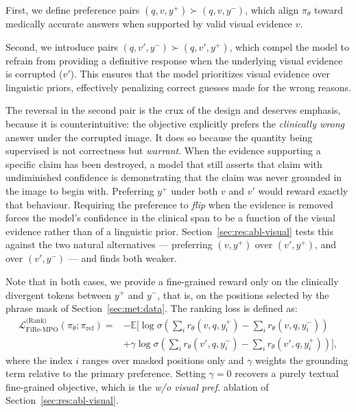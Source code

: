 First, we define preference pairs $(q, v, y^+) \succ (q, v, y^-)$, which align $\pi_\theta$ toward medically accurate answers when supported by valid visual evidence $v$.

Second, we introduce pairs $(q, v', y^-) \succ (q, v', y^+)$, which compel the model to refrain from providing a definitive response when the underlying visual evidence is corrupted ($v'$). This ensures that the model prioritizes visual evidence over linguistic priors, effectively penalizing correct guesses made for the wrong reasons.

The reversal in the second pair is the crux of the design and deserves emphasis, because it is counterintuitive: the objective explicitly prefers the \emph{clinically wrong} answer under the corrupted image. It does so because the quantity being supervised is not correctness but \emph{warrant}. When the evidence supporting a specific claim has been destroyed, a model that still asserts that claim with undiminished confidence is demonstrating that the claim was never grounded in the image to begin with. Preferring $y^+$ under both $v$ and $v'$ would reward exactly that behaviour. Requiring the preference to \emph{flip} when the evidence is removed forces the model's confidence in the clinical span to be a function of the visual evidence rather than of a linguistic prior. Section~\ref{sec:res:abl-visual} tests this against the two natural alternatives --- preferring $(v, y^+)$ over $(v', y^+)$, and over $(v', y^-)$ --- and finds both weaker.

Note that in both cases, we provide a fine-grained reward only on the clinically divergent tokens between $y^+$ and $y^-$, that is, on the positions selected by the phrase mask of Section~\ref{sec:met:data}. The ranking loss is defined as:
\begin{equation}\label{eq:firempo-rank}
\begin{split}
\mathcal{L}^{\text{(Rank)}}_{\text{FiRe-MPO}}(\pi_{\theta};\pi_{\text{ref}}) = &
-\mathbb{E}
\biggl[
\log \sigma \left(\sum_{i} r_\theta(v,q,y^+_i) - \sum_{i} r_\theta(v,q,y^-_i)\right) \\
& + \gamma\log \sigma \left(\sum_{i} r_\theta(v',q,y^-_i) - \sum_{i} r_\theta(v',q,y^+_i)\right)
\biggr],
\end{split}
\end{equation}
where the index $i$ ranges over masked positions only and $\gamma$ weights the grounding term relative to the primary preference. Setting $\gamma = 0$ recovers a purely textual fine-grained objective, which is the \emph{w/o visual pref.} ablation of Section~\ref{sec:res:abl-visual}.

